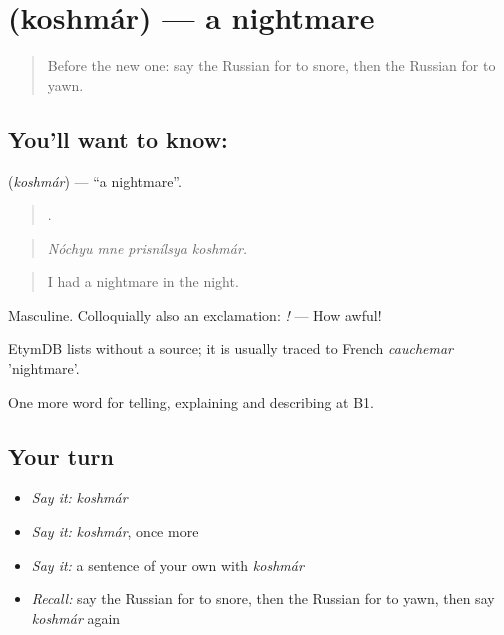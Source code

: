 \section[\texorpdfstring{\ru{кошмар} (koshmár)}{кошмар (koshmár)}]{ (koshmár) — a nightmare}

\label{lesson:RU-C488-koshmar}



\begin{quote}
Before the new one: say the Russian for to snore, then the Russian for to yawn.
\end{quote}

\subsection*{You'll want to know: }
\textbf{} (\emph{koshmár}) — \textquotedblleft{}a nightmare\textquotedblright{}.

\begin{quote}
   .
\end{quote}

\begin{quote}
\emph{Nóchyu mne prisnílsya koshmár.}
\end{quote}

\begin{quote}
I had a nightmare in the night.
\end{quote}

Masculine. Colloquially also an exclamation: \emph{ !} — How awful!

\begin{cousinweb}
EtymDB lists \emph{} without a source; it is usually traced to French \emph{cauchemar} 'nightmare'.
\end{cousinweb}

\begin{grammarlens}[title={What you've built}]
One more word for telling, explaining and describing at B1.
\end{grammarlens}

\subsection*{Your turn}
\begin{itemize}
\raggedright
  \item \emph{Say it:} \emph{koshmár}
  \item \emph{Say it:} \emph{koshmár}, once more
  \item \emph{Say it:} a sentence of your own with \emph{koshmár}
  \item \emph{Recall:} say the Russian for to snore, then the Russian for to yawn, then say \emph{koshmár} again
\end{itemize}


